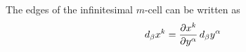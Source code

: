 The edges of the infinitesimal $m$-cell can be written as
\begin{equation}
d_\beta x^k =  {\partial x^k \over \partial y^\alpha }\,d_\beta y^\alpha
\end{equation}











